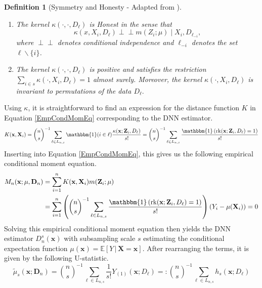 \documentclass[letterpaper,10pt]{article}
\numberwithin{equation}{section}
\numberwithin{thm}{section}
\newtheorem{dfn}{Definition}
\newcommand{\1}{\mathbb{1}}
\newcommand{\indep}{\perp\!\!\!\!\perp}
\begin{document}
\vspace{0.5cm}
\begin{dfn}[Symmetry and Honesty - Adapted from \citet{ritzwoller_uniform_2024}]\label{Symmetry_Honesty}
	\begin{enumerate}
		\item The kernel $\kappa\left(\cdot, \cdot, D_{\ell}\right)$ is Honest in the sense that
		      $$\kappa\left(x, X_i, D_{\ell}\right) \indep m\left(Z_i ; \mu\right) \mid X_i, D_{\ell_{-i}},$$
		      where $\indep$ denotes conditional independence and $\ell_{-i}$ denotes the set $\ell \backslash\{i\}$.
		\item The kernel $\kappa\left(\cdot, \cdot, D_{\ell}\right)$ is positive and satisfies the restriction
		      $\sum_{i \in s} \kappa\left(\cdot, X_i, D_{\ell}\right)=1$ almost surely.
		      Moreover, the kernel $\kappa\left(\cdot, X_i, D_{\ell}\right)$ is invariant to permutations of the data $D_{\ell}.$
	\end{enumerate}
\end{dfn}
Using $\kappa$, it is straightforward to find an expression for the distance function $K$ in Equation \ref{EmpCondMomEq} corresponding to the DNN estimator.
\begin{equation}
	K(\mathbf{x}, \mathbf{X}_i)
	= \binom{n}{s}^{-1} \sum_{\ell \in L_{n,s}} \mathbbm{1}(i \in \ell)\frac{\kappa(\mathbf{x}; \mathbf{Z}_i, D_{\ell})}{s!}
	= \binom{n}{s}^{-1} \sum_{\ell \in L_{n,s}} \frac{\mathbbm{1}\left(\operatorname{rk}(\mathbf{x}; \mathbf{Z}_i, D_{\ell}) = 1\right)}{s!}
\end{equation}
Inserting into Equation \ref{EmpCondMomEq}, this gives us the following empirical conditional moment equation.
\begin{equation}
	\begin{aligned}
		M_n(\mathbf{x}; \mu, \mathbf{D}_n)
		 & = \sum_{i = 1}^{n}K(\mathbf{x}, \mathbf{X}_i)m(\mathbf{Z}_i; \mu)                                                                                                                                         \\
		 & = \sum_{i = 1}^{n}\left(\binom{n}{s}^{-1} \sum_{\ell \in L_{n,s}} \frac{\mathbbm{1}\left(\operatorname{rk}(\mathbf{x}; \mathbf{Z}_i, D_{\ell}) = 1\right)}{s!}\right)\left(Y_i - \mu(\mathbf{X}_i)\right)
		= 0
	\end{aligned}
\end{equation}
Solving this empirical conditional moment equation then yields the DNN estimator $D_{n}^{s}(\mathbf{x})$ with subsampling scale $s$ estimating the conditional expectation function $\mu(\mathbf{x}) = \mathbb{E}\left[Y \, | \, \mathbf{X} = \mathbf{x}\right]$.
After rearranging the terms, it is given by the following U-statistic.
\begin{equation}\label{U_stat}
	\tilde{\mu}_{s}(\mathbf{x}; \mathbf{D}_n)
	= \binom{n}{s}^{-1} \sum_{\ell \in L_{n,s}} \frac{1}{s!} Y_{(1)}(\mathbf{x}; D_{\ell})
	=: \binom{n}{s}^{-1} \sum_{\ell \in L_{n,s}} h_{s}(\mathbf{x}; D_{\ell})
\end{equation}
\end{document}
